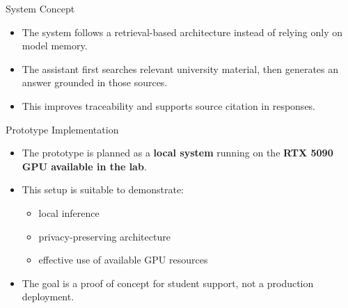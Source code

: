 \begin{frame}{System Concept}
	\begin{itemize}
		\item The system follows a retrieval-based architecture instead of relying only on model memory.
		\item The assistant first searches relevant university material, then generates an answer grounded in those sources.
		\item This improves traceability and supports source citation in responses.
	\end{itemize}

	\vspace{0.8em}
	\begin{center}
	\end{center}
\end{frame}


\begin{frame}{Prototype Implementation}
	\begin{itemize}
		\item The prototype is planned as a \textbf{local system} running on the \textbf{RTX 5090 GPU available in the lab}.
		\item This setup is suitable to demonstrate:
		\begin{itemize}
			\item local inference
			\item privacy-preserving architecture
			\item effective use of available GPU resources
		\end{itemize}
		\item The goal is a proof of concept for student support, not a production deployment.
	\end{itemize}
\end{frame}

